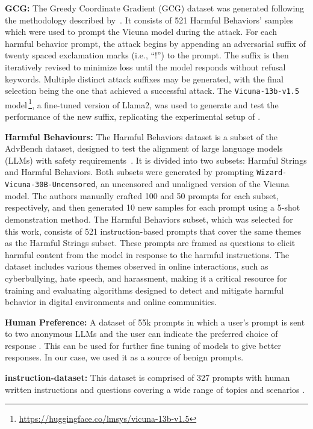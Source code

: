 \noindent\textbf{GCG:} The Greedy Coordinate Gradient (GCG) dataset was generated following the methodology described by~\cite{zou2023universal}. It consists of 521 Harmful Behaviors' samples which were used to prompt the Vicuna model during the attack. For each harmful behavior prompt, the attack begins by appending an adversarial suffix of twenty spaced exclamation marks (i.e., ``!'') to the prompt. The suffix is then iteratively revised to minimize loss until the model responds without refusal keywords. Multiple distinct attack suffixes may be generated, with the final selection being the one that achieved a successful attack. The {\tt Vicuna-13b-v1.5} model\,\footnote{\url{https://huggingface.co/lmsys/vicuna-13b-v1.5}}, a fine-tuned version of Llama2, was used to generate and test the performance of the new suffix, replicating the experimental setup of \cite{DBLP:journals/corr/abs-2308-14132}.

\noindent\textbf{Harmful Behaviours:} The Harmful Behaviors dataset is a subset of the AdvBench dataset, designed to test the alignment of large language models (LLMs) with safety requirements~\cite{zou2023universal}. It is divided into two subsets: Harmful Strings and Harmful Behaviors. Both subsets were generated by prompting {\tt Wizard-Vicuna-30B-Uncensored}, an uncensored and unaligned version of the Vicuna model. The authors manually crafted 100 and 50 prompts for each subset, respectively, and then generated 10 new samples for each prompt using a 5-shot demonstration method. The Harmful Behaviors subset, which was selected for this work, consists of 521 instruction-based prompts that cover the same themes as the Harmful Strings subset. These prompts are framed as questions to elicit harmful content from the model in response to the harmful instructions. The dataset includes various themes observed in online interactions, such as cyberbullying, hate speech, and harassment, making it a critical resource for training and evaluating algorithms designed to detect and mitigate harmful behavior in digital environments and online communities.

\noindent\textbf{Human Preference:} A dataset of 55k prompts in which a user's prompt is sent to two anonymous LLMs and the user can indicate the preferred choice of response \cite{chiang2024chatbot}. This can be used for further fine tuning of models to give better responses. In our case, we used it as a source of benign prompts.

\noindent\textbf{instruction-dataset:} This dataset is comprised of 327 prompts with human written instructions and questions covering a wide range of topics and scenarios \cite{H4instructiondataset}.

